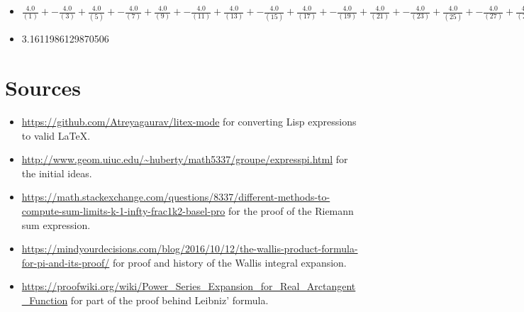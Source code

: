 \documentclass[11pt]{article}
\begin{document}
\begin{itemize}
\item \(\frac{4.0}{\left( 1 \right)} + -\frac{4.0}{\left( 3 \right)} + \frac{4.0}{\left( 5 \right)} + -\frac{4.0}{\left( 7 \right)} + \frac{4.0}{\left( 9 \right)} + -\frac{4.0}{\left( 11 \right)} + \frac{4.0}{\left( 13 \right)} + -\frac{4.0}{\left( 15 \right)} + \frac{4.0}{\left( 17 \right)} + -\frac{4.0}{\left( 19 \right)} + \frac{4.0}{\left( 21 \right)} + -\frac{4.0}{\left( 23 \right)} + \frac{4.0}{\left( 25 \right)} + -\frac{4.0}{\left( 27 \right)} + \frac{4.0}{\left( 29 \right)} + -\frac{4.0}{\left( 31 \right)} + \frac{4.0}{\left( 33 \right)} + -\frac{4.0}{\left( 35 \right)} + \frac{4.0}{\left( 37 \right)} + -\frac{4.0}{\left( 39 \right)} + \frac{4.0}{\left( 41 \right)} + -\frac{4.0}{\left( 43 \right)} + \frac{4.0}{\left( 45 \right)} + -\frac{4.0}{\left( 47 \right)} + \frac{4.0}{\left( 49 \right)} + -\frac{4.0}{\left( 51 \right)} + \frac{4.0}{\left( 53 \right)} + -\frac{4.0}{\left( 55 \right)} + \frac{4.0}{\left( 57 \right)} + -\frac{4.0}{\left( 59 \right)} + \frac{4.0}{\left( 61 \right)} + -\frac{4.0}{\left( 63 \right)} + \frac{4.0}{\left( 65 \right)} + -\frac{4.0}{\left( 67 \right)} + \frac{4.0}{\left( 69 \right)} + -\frac{4.0}{\left( 71 \right)} + \frac{4.0}{\left( 73 \right)} + -\frac{4.0}{\left( 75 \right)} + \frac{4.0}{\left( 77 \right)} + -\frac{4.0}{\left( 79 \right)} + \frac{4.0}{\left( 81 \right)} + -\frac{4.0}{\left( 83 \right)} + \frac{4.0}{\left( 85 \right)} + -\frac{4.0}{\left( 87 \right)} + \frac{4.0}{\left( 89 \right)} + -\frac{4.0}{\left( 91 \right)} + \frac{4.0}{\left( 93 \right)} + -\frac{4.0}{\left( 95 \right)} + \frac{4.0}{\left( 97 \right)} + -\frac{4.0}{\left( 99 \right)} + \frac{4.0}{\left( 101 \right)}\)
\item 3.1611986129870506
\end{itemize}

\section{Sources}
\label{sec:org188e686}
\begin{itemize}
\item \url{https://github.com/Atreyagaurav/litex-mode} for converting Lisp expressions to valid \LaTeX{}.
\item \url{http://www.geom.uiuc.edu/\~huberty/math5337/groupe/expresspi.html} for the initial ideas.
\item \url{https://math.stackexchange.com/questions/8337/different-methods-to-compute-sum-limits-k-1-infty-frac1k2-basel-pro} for the proof of the Riemann sum expression.
\item \url{https://mindyourdecisions.com/blog/2016/10/12/the-wallis-product-formula-for-pi-and-its-proof/} for proof and history of the Wallis integral expansion.
\item \url{https://proofwiki.org/wiki/Power\_Series\_Expansion\_for\_Real\_Arctangent\_Function} for part of the proof behind Leibniz' formula.
\end{itemize}
\end{document}
